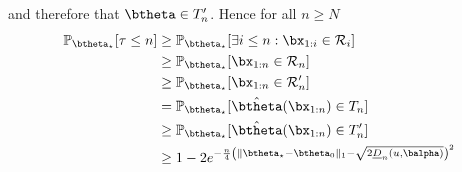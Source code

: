 \documentclass[11pt]{article}
\begin{document}
and therefore that $\btheta \in T_n'$. Hence for all $n \geq N$
\begin{align*}
  \mathbb{P}_{\btheta_\star}[\tau \leq n] &\geq \mathbb{P}_{\btheta_\star}[\exists i \leq n : \bx_{1:i} \in \mathcal{R}_i]\\ 
&\geq \mathbb{P}_{\btheta_\star}[\bx_{1:n} \in \mathcal{R}_n]\\ 
&\geq \mathbb{P}_{\btheta_\star}[\bx_{1:n} \in \mathcal{R}'_n]\\ 
&= \mathbb{P}_{\btheta_\star}[\hat{\btheta}(\bx_{1:n}) \in T_n]\\ 
&\geq \mathbb{P}_{\btheta_\star}[\hat{\btheta}(\bx_{1:n}) \in T_n']\\
&\geq 1 -2e^{-\frac{n}{4}\left(\|\btheta_\star - \btheta_0\|_1-\sqrt{2\underline{D}_n(u,\balpha)}\right)^2}
\end{align*}
\end{document}
